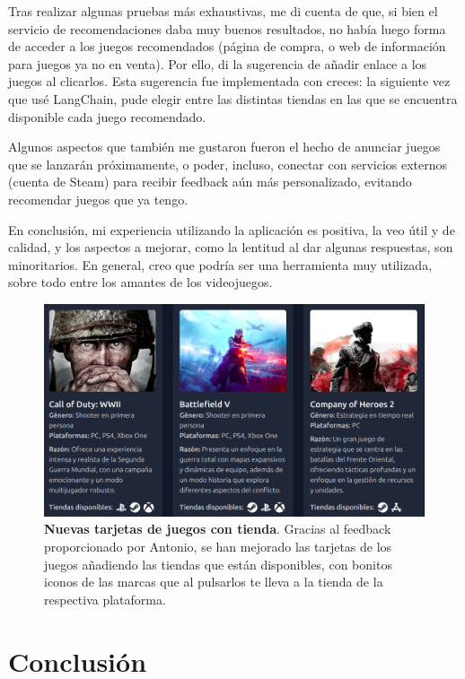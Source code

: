 Tras realizar algunas pruebas más exhaustivas, me di cuenta de que, si bien el servicio de recomendaciones daba muy buenos resultados, no había luego forma de acceder a los juegos recomendados (página de compra, o web de información para juegos ya no en venta). Por ello, di la sugerencia de añadir enlace a los juegos al clicarlos. Esta sugerencia fue implementada con creces: la siguiente vez que usé LangChain, pude elegir entre las distintas tiendas en las que se encuentra disponible cada juego recomendado.

Algunos aspectos que también me gustaron fueron el hecho de anunciar juegos que se lanzarán próximamente, o poder, incluso, conectar con servicios externos (cuenta de Steam) para recibir feedback aún más personalizado, evitando recomendar juegos que ya tengo.

En conclusión, mi experiencia utilizando la aplicación es positiva, la veo útil y de calidad, y los aspectos a mejorar, como la lentitud al dar algunas respuestas, son minoritarios. En general, creo que podría ser una herramienta muy utilizada, sobre todo entre los amantes  de los videojuegos.


\begin{figure}[H]
	\centering
	\includegraphics[width=1\linewidth]{imagenes/tarjetasConTiendas.png}
	\caption[\textbf{Nuevas tarjetas de juegos con tienda}.]{\textbf{Nuevas tarjetas de juegos con tienda}. Gracias al feedback proporcionado por Antonio, se han mejorado las tarjetas de los juegos añadiendo las tiendas que están disponibles, con bonitos iconos de las marcas que al pulsarlos te lleva a la tienda de la respectiva plataforma.}
	\label{swagger-1}
\end{figure}

\newpage

\section{Conclusión}

